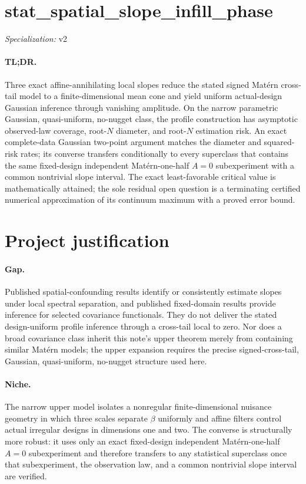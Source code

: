\documentclass{article}
\begin{document}
\sloppy

\section*{stat\_\allowbreak{}spatial\_\allowbreak{}slope\_\allowbreak{}infill\_\allowbreak{}phase}

\noindent\textit{Specialization:} v2\par

\paragraph{TL;DR.} Three exact affine-annihilating local slopes reduce the stated signed Mat\'ern cross-tail model to a finite-dimensional mean cone and yield uniform actual-design Gaussian inference through vanishing amplitude. On the narrow parametric Gaussian, quasi-uniform, no-nugget class, the profile construction has asymptotic observed-law coverage, root-\(N\) diameter, and root-\(N\) estimation risk. An exact complete-data Gaussian two-point argument matches the diameter and squared-risk rates; its converse transfers conditionally to every superclass that contains the same fixed-design independent Mat\'ern-one-half \(A=0\) subexperiment with a common nontrivial slope interval. The exact least-favorable critical value is mathematically attained; the sole residual open question is a terminating certified numerical approximation of its continuum maximum with a proved error bound.

\section{Project justification}

\paragraph{Gap.} Published spatial-confounding results identify or consistently estimate slopes under local spectral separation, and published fixed-domain results provide inference for selected covariance functionals. They do not deliver the stated design-uniform profile inference through a cross-tail local to zero. Nor does a broad covariance class inherit this note's upper theorem merely from containing similar Mat\'ern models; the upper expansion requires the precise signed-cross-tail, Gaussian, quasi-uniform, no-nugget structure used here.

\paragraph{Niche.} The narrow upper model isolates a nonregular finite-dimensional nuisance geometry in which three scales separate \(\beta\) uniformly and affine filters control actual irregular designs in dimensions one and two. The converse is structurally more robust: it uses only an exact fixed-design independent Mat\'ern-one-half \(A=0\) subexperiment and therefore transfers to any statistical superclass once that subexperiment, the observation law, and a common nontrivial slope interval are verified.
\end{document}
